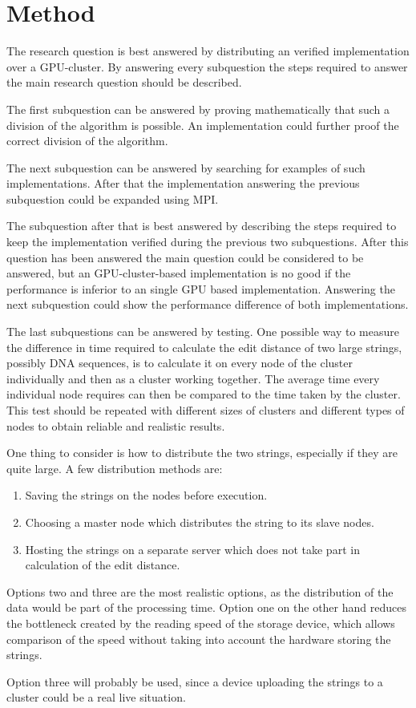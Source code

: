 \section{Method}
The research question is best answered by distributing an verified implementation over a GPU-cluster.
By answering every subquestion the steps required to answer the main research question should be described.

The first subquestion can be answered by proving mathematically that such a division of the algorithm is possible.
An implementation could further proof the correct division of the algorithm.

The next subquestion can be answered by searching for examples of such implementations.
After that the implementation answering the previous subquestion could be expanded using MPI.

The subquestion after that is best answered by describing the steps required to keep the implementation verified during the previous two subquestions.
After this question has been answered the main question could be considered to be answered, but an GPU-cluster-based implementation is no good if the performance is inferior to an single GPU based implementation.
Answering the next subquestion could show the performance difference of both implementations.

The last subquestions can be answered by testing.
One possible way to measure the difference in time required to calculate the edit distance of two large strings, possibly DNA sequences, is to calculate it on every node of the cluster individually and then as a cluster working together.
The average time every individual node requires can then be compared to the time taken by the cluster.
This test should be repeated with different sizes of clusters and different types of nodes to obtain reliable and realistic results.

One thing to consider is how to distribute the two strings, especially if they are quite large. A few distribution methods are:
\begin{enumerate}
    \item Saving the strings on the nodes before execution.
    \item Choosing a master node which distributes the string to its slave nodes.
    \item Hosting the strings on a separate server which does not take part in calculation of the edit distance.
\end{enumerate}
Options two and three are the most realistic options, as the distribution of the data would be part of the processing time. Option one on the other hand reduces the bottleneck created by the reading speed of the storage device, which allows comparison of the speed without taking into account the hardware storing the strings.

Option three will probably be used, since a device uploading the strings to a cluster could be a real live situation.

